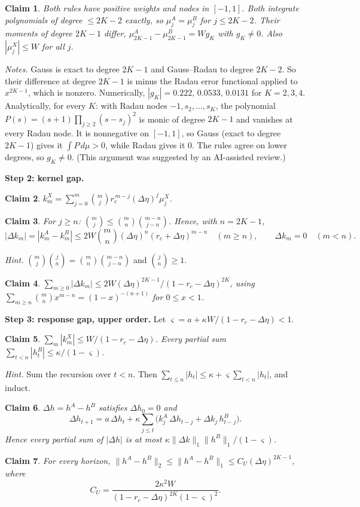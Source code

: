 \documentclass[11pt]{article}
\newtheorem{claim}{Claim}
\begin{document}
\begin{claim}\label{c:pair} Both rules have positive weights and nodes in $[-1,1]$. Both integrate polynomials of degree $\le2K-2$ exactly, so $\mu^A_j=\mu^B_j$ for $j\le2K-2$. Their moments of degree $2K-1$ differ, $\mu^A_{2K-1}-\mu^B_{2K-1}=Wg_K$ with $g_K\ne0$. Also $|\mu^X_j|\le W$ for all $j$.\end{claim}
\textit{Notes.} Gauss is exact to degree $2K-1$ and Gauss--Radau to degree $2K-2$. So their difference at degree $2K-1$ is minus the Radau error functional applied to $x^{2K-1}$, which is nonzero. Numerically, $|g_K|=0.222,\,0.0533,\,0.0131$ for $K=2,3,4$. Analytically, for every $K$: with Radau nodes $-1,s_2,\ldots,s_K$, the polynomial $P(s)=(s+1)\prod_{j\ge2}(s-s_j)^2$ is monic of degree $2K-1$ and vanishes at every Radau node. It is nonnegative on $[-1,1]$, so Gauss (exact to degree $2K-1$) gives it $\int P\,d\mu>0$, while Radau gives it $0$. The rules agree on lower degrees, so $g_K\ne0$. (This argument was suggested by an AI-assisted review.)

\textbf{Step 2: kernel gap.}
\begin{claim}\label{c:expand} $k^X_m=\sum_{j=0}^m\binom mj r_c^{\,m-j}(\Delta\eta)^j\mu^X_j$.\end{claim}
\begin{claim}\label{c:choose} For $j\ge n$: $\binom mj\le\binom mn\binom{m-n}{j-n}$. Hence, with $n=2K-1$,
\[
|\Delta k_m|=|k^A_m-k^B_m|\le2W\binom mn(\Delta\eta)^n(r_c+\Delta\eta)^{m-n}\quad(m\ge n),\qquad \Delta k_m=0\quad(m<n).
\]\end{claim}
\textit{Hint.} $\binom mj\binom jn=\binom mn\binom{m-n}{j-n}$ and $\binom jn\ge1$.
\begin{claim}\label{c:l1} $\sum_{m\ge0}|\Delta k_m|\le2W(\Delta\eta)^{2K-1}/(1-r_c-\Delta\eta)^{2K}$, using $\sum_{m\ge n}\binom mn x^{m-n}=(1-x)^{-(n+1)}$ for $0\le x<1$.\end{claim}

\textbf{Step 3: response gap, upper order.} Let $\varsigma=a+\kappa W/(1-r_c-\Delta\eta)<1$.
\begin{claim}\label{c:h1} $\sum_m|k^X_m|\le W/(1-r_c-\Delta\eta)$. Every partial sum $\sum_{t<n}|h^B_t|\le\kappa/(1-\varsigma)$.\end{claim}
\textit{Hint.} Sum the recursion over $t<n$. Then $\sum_{t\le n}|h_t|\le\kappa+\varsigma\sum_{t<n}|h_t|$, and induct.
\begin{claim}\label{c:dh} $\Delta h=h^A-h^B$ satisfies $\Delta h_0=0$ and
\[
\Delta h_{t+1}=a\,\Delta h_t+\kappa\sum_{j\le t}\bigl(k^A_j\,\Delta h_{t-j}+\Delta k_j\,h^B_{t-j}\bigr).
\]
Hence every partial sum of $|\Delta h|$ is at most $\kappa\|\Delta k\|_1\|h^B\|_1/(1-\varsigma)$.\end{claim}
\begin{claim}\label{c:upper} For every horizon, $\|h^A-h^B\|_2\le\|h^A-h^B\|_1\le C_U(\Delta\eta)^{2K-1}$, where
\[
C_U=\frac{2\kappa^2W}{(1-r_c-\Delta\eta)^{2K}(1-\varsigma)^2}.
\]\end{claim}
\end{document}
